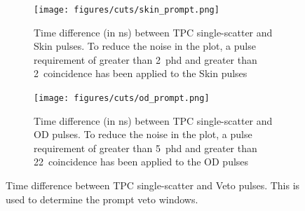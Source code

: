 \begin{figure}
     \centering
     \begin{subfigure}[b]{0.48\textwidth}
         \centering
         \texttt{[image: figures/cuts/skin\_prompt.png]}
         \caption{Time difference (in ns) between TPC single-scatter and Skin pulses.
         To reduce the noise in the plot, a pulse requirement of greater than 2~phd and greater than 2~coincidence has been applied to the Skin pulses}
         \label{fig:skin_prompt_window}
     \end{subfigure}
     \hfill
     \begin{subfigure}[b]{0.48\textwidth}
         \centering
         \texttt{[image: figures/cuts/od\_prompt.png]}
         \caption{Time difference (in ns) between TPC single-scatter and OD pulses.
         To reduce the noise in the plot, a pulse requirement of greater than 5~phd and greater than 22~coincidence has been applied to the OD pulses}
         \label{fig:od_prompt_window}
     \end{subfigure}
    \caption{Time difference between TPC single-scatter and Veto pulses.
    This is used to determine the prompt veto windows.}
    \label{fig:veto_prompt_windows}
\end{figure}


